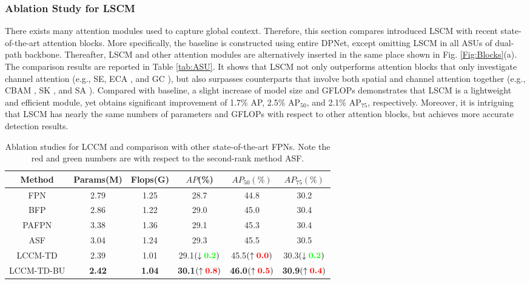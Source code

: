 \documentclass[lettersize,journal]{IEEEtran}
\begin{document}
\subsubsection{Ablation Study for LSCM}
There exists many attention modules used to capture global context. Therefore, this section compares introduced LSCM with recent state-of-the-art attention blocks. More specifically, the baseline is constructed using entire DPNet, except omitting LSCM in all ASUs of dual-path backbone. Thereafter, LSCM and other attention modules are alternatively inserted in the same place shown in Fig. \ref{Fig:Blocks}(a). The comparison results are reported in Table \ref{tab:ASU}. It shows that LSCM not only outperforms attention blocks that only investigate channel attention (e.g., SE\cite{hu2018squeeze}, ECA \cite{ecanet}, and GC \cite{cao2019gcnet}), but also surpasses counterparts that involve both spatial and channel attention together (e.g., CBAM \cite{woo2018cbam}, SK \cite{li2019selective}, and SA \cite{zhang2021sa}). Compared with baseline, a slight increase of model size and GFLOPs demonstrates that LSCM is a lightweight and efficient module, yet obtains significant improvement of 1.7\% AP, 2.5\% AP$_{50}$, and 2.1\% AP$_{75}$, respectively. Moreover, it is intriguing that LSCM has nearly the same numbers of parameters and GFLOPs with respect to other attention blocks, but achieves more accurate detection results. 



\begin{table}[t!] 
	\tabcolsep 0.5mm \caption{Ablation studies for LCCM and comparison with other state-of-the-art FPNs. Note the red and green numbers are with respect to the second-rank method ASF\cite{guo2020augfpn}.}
	\begin{center}
		\begin{tabular}{c|c|c|c|c|c}
			\toprule \multirow{1}{*}{Method} &\multirow{1}{*}{Params(M)}  & \multirow{1}{*}{Flops(G)}& \multirow{1}{*}{$AP$(\%)}& \multirow{1}{*}{$AP_{50}(\%)$}& \multirow{1}{*}{$AP_{75}(\%)$}\\ \midrule
			FPN\cite{lin2017feature} &2.79 &1.25&28.7&44.8&30.2 \\			
			BFP\cite{pang2019libra} &2.86 &1.22&29.0&45.0&30.4 \\
			PAFPN\cite{tan2020efficientdet} &3.38 &1.36 &29.1 &45.3 &30.4 \\			
			ASF\cite{guo2020augfpn} &3.04 &1.24&29.3&45.5&30.5 \\
\midrule
			LCCM-TD  &2.39 &1.01 &29.1$(\downarrow\textcolor{green}{\textbf{0.2}})$ &45.5$(\uparrow\textcolor{red}{\textbf{0.0}})$ & 30.3$(\downarrow\textcolor{green}{\textbf{0.2}})$\\
			LCCM-TD-BU  &\textbf{2.42} &\textbf{1.04} & \textbf{30.1}$(\uparrow\textcolor{red}{\textbf{0.8}})$ & \textbf{46.0}$(\uparrow\textcolor{red}{\textbf{0.5}})$ & \textbf{30.9}$(\uparrow\textcolor{red}{\textbf{0.4}})$\\
\bottomrule
		\end{tabular}
	\end{center}\label{tab:LCCM}
\end{table}
\end{document}
